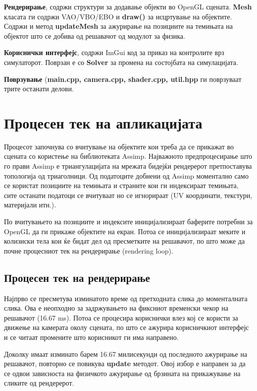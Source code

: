 \textbf{Рендерирање}, содржи структури за додавање објекти во OpenGL сцената. \textbf{Mesh} класата ги содржи VAO/VBO/EBO и \textbf{draw()} за исцртување на објектите. Содржи и метод \textbf{updateMesh} за ажурирање на позициите на темињата на објектот што се добива од решавачот од модулот за физика.

\textbf{Кориснички интерфејс}, содржи ImGui код за приказ на контролите врз симулаторот. Поврзан е со \textbf{Solver} за промена на состојбата на симулацијата.

\textbf{Поврзување} (\textbf{main.cpp, camera.cpp, shader.cpp, util.hpp} ги поврзуваат трите останати делови.

\section{Процесен тек на апликацијата}
Процесот започнува со вчитување на објектите кои треба да се прикажат во сцената со користење на библиотеката Assimp. Најважното предпроцесирање што го прави Assimp е триангулацијата  на мрежата бидејќи рендерерот претпоставува топологија од триаголници. Од податоците добиени од Assimp моментално само се користат позициите на темињата и страните кои ги индексираат темињата, сите останати податоци се вчитуваат но се игнорираат (UV координати, текстури, материјали итн.). 

По вчитувањето на позициите и индексите иницијализираат баферите потребни за OpenGL да ги  прикаже објектите на екран. Потоа се иницијализираат меките и колизиски тела кои ќе бидат дел од пресметките на решавачот, по што може да почне процесниот тек на рендерирање (rendering loop).

\subsection{Процесен тек на рендерирање}
Најпрво се пресметува изминатото време од претходната слика до моменталната слика. Ова е неопходно за задржувањето на фиксниот временски чекор на решавачот (16.67 ms).  Потоа се процесира кориснички влез кој се користи за движење на камерата околу сцената, по што се ажурира корисничкиот интерфејс и се читаат промените што корисникот ги има направено. 

Доколку  имаат изминато барем 16.67 милисекунди од последното ажурирање на решавачот, повторно се повикува \textbf{update} методот. Овој избор е направен за да се одвои зависноста на физичкото ажурирање од брзината на прикажување на сликите од рендерерот. 

